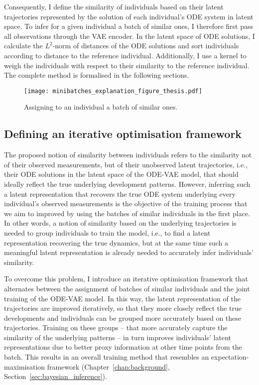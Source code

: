 Consequently, I define the similarity of individuals based on their latent trajectories represented by the solution of each individual's ODE system in latent space. To infer for a given individual a batch of similar ones, I therefore first pass all observations through the VAE encoder. In the latent space of ODE solutions, I calculate the $L^2$-norm of distances of the ODE solutions and sort individuals according to distance to the reference individual. 
Additionally, I use a kernel to weigh the individuals with respect to their similarity to the reference individual. The complete method is formalised in the following sections.

\begin{figure}
	\texttt{[image: minibatches\_explanation\_figure\_thesis.pdf]}
	\caption{Assigning to an individual a batch of similar ones.}
	\label{fig:minibatches_explanation}
\end{figure}

\subsection{Defining an iterative optimisation framework}\label{sec:methods-batches-EMprocedure}

The proposed notion of similarity between individuals refers to the similarity not of their observed measurements, but of their unobserved latent trajectories, i.e., their ODE solutions in the latent space of the ODE-VAE model, that should ideally reflect the true underlying development patterns. However, inferring such a latent representation that recovers the true ODE system underlying every individual's observed measurements is the objective of the training process that we aim to improved by using the batches of similar individuals in the first place. 
In other words, a notion of similarity based on the underlying trajectories is needed to group individuals to train the model, i.e., to find a latent representation recovering the true dynamics, but at the same time such a meaningful latent representation is already needed to accurately infer individuals' similarity. 

To overcome this problem, I introduce an iterative optimisation framework that alternates between the assignment of batches of similar individuals and the joint training of the ODE-VAE model.
In this way, the latent representation of the trajectories are improved iteratively, so that they more closely reflect the true developments and individuals can be grouped more accurately based on these trajectories. Training on these groups -- that more accurately capture the similarity of the underlying patterns -- in turn improves individuals' latent representations due to better proxy information at other time points from the batch. This results in an overall training method that resembles an expectation-maximisation framework (Chapter~\ref{chap:background}, Section~\ref{sec:bayesian_inference}).\\ 

